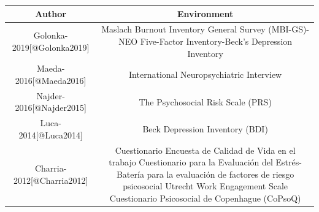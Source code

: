 \documentclass[]{article}
\begin{document}
\begin{longtable}[]{@{}cc@{}}
\toprule
\begin{minipage}[b]{0.26\columnwidth}\centering
\textbf{Author}\strut
\end{minipage} & \begin{minipage}[b]{0.68\columnwidth}\centering
\textbf{Environment}\strut
\end{minipage}\tabularnewline
\midrule
\endhead
\begin{minipage}[t]{0.26\columnwidth}\centering
Golonka-2019{[}@Golonka2019{]}\strut
\end{minipage} & \begin{minipage}[t]{0.68\columnwidth}\centering
Maslach Burnout Inventory General Survey (MBI-GS)-NEO Five-Factor
Inventory-Beck's Depression Inventory\strut
\end{minipage}\tabularnewline
\begin{minipage}[t]{0.26\columnwidth}\centering
Maeda-2016{[}@Maeda2016{]}\strut
\end{minipage} & \begin{minipage}[t]{0.68\columnwidth}\centering
International Neuropsychiatric Interview\strut
\end{minipage}\tabularnewline
\begin{minipage}[t]{0.26\columnwidth}\centering
Najder-2016{[}@Najder2015{]}\strut
\end{minipage} & \begin{minipage}[t]{0.68\columnwidth}\centering
The Psychosocial Risk Scale (PRS)\strut
\end{minipage}\tabularnewline
\begin{minipage}[t]{0.26\columnwidth}\centering
Luca-2014{[}@Luca2014{]}\strut
\end{minipage} & \begin{minipage}[t]{0.68\columnwidth}\centering
Beck Depression Inventory (BDI)\strut
\end{minipage}\tabularnewline
\begin{minipage}[t]{0.26\columnwidth}\centering
Charria-2012{[}@Charria2012{]}\strut
\end{minipage} & \begin{minipage}[t]{0.68\columnwidth}\centering
Cuestionario Encuesta de Calidad de Vida en el trabajo Cuestionario para
la Evaluación del Estrés-Batería para la evaluación de factores de
riesgo psicosocial Utrecht Work Engagement Scale Cuestionario
Psicosocial de Copenhague (CoPsoQ)\strut
\end{minipage}\tabularnewline

\end{longtable}
\end{document}
